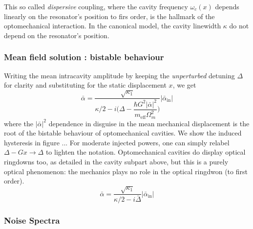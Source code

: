 This so called \textit{dispersive} coupling, where the cavity frequency $\omega_c(x)$ depends linearly on the resonator's position to firs order, is the hallmark of the optomechanical interaction. In the canonical model, the cavity linewidth $\kappa$ do not depend on the resonator's position. 


\subsubsection{Mean field solution : bistable behaviour}
Writing the mean intracavity amplitude by keeping the \textit{unperturbed} detuning $\Delta$ for clarity and substituting for the static displacement $x$, we get
\begin{equation}
  \bar{\alpha} = \frac{\sqrt{\kappa_1}}{ \kappa/2 - i \Big( \Delta - \dfrac{\hbar G^2  |\bar{\alpha}|^2}{m_{\text{eff}} \Omega_m^2 } \Big)} |\bar{\alpha}_{\text{in}}|
\end{equation}
where the $|\bar{\alpha}|^2$ dependence in disguise in the mean mechanical displacement is the root of the bistable behaviour of optomechanical cavities. We show the induced hysteresis in figure ... For moderate injected powers, one can simply relabel $\Delta - Gx \rightarrow \Delta$ to lighten the notation. Optomechanical cavities do display optical ringdowns too, as detailed in the cavity subpart above, but this is a purely optical phenomenon: the mechanics plays no role in the optical ringdwon (to first order).
\begin{equation}
  \bar{\alpha} = \frac{\sqrt{\kappa_1}}{ \kappa/2 - i  \bar \Delta} |\bar{\alpha}_{\text{in}}|\label{eq:alpha}
\end{equation}
\subsubsection{Noise Spectra}

